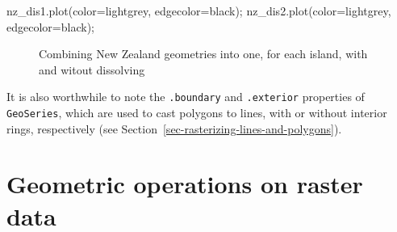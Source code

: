 \documentclass[
  letterpaper,
]{krantz}
\newenvironment{Shaded}{\begin{snugshade}}{\end{snugshade}}
\newcommand{\NormalTok}[1]{\textcolor[rgb]{0.00,0.23,0.31}{#1}}
\newcommand{\OperatorTok}[1]{\textcolor[rgb]{0.37,0.37,0.37}{#1}}
\newcommand{\StringTok}[1]{\textcolor[rgb]{0.13,0.47,0.30}{#1}}
\begin{document}
\begin{Shaded}
\begin{Highlighting}[]
\NormalTok{nz\_dis1.plot(color}\OperatorTok{=}\StringTok{\textquotesingle{}lightgrey\textquotesingle{}}\NormalTok{, edgecolor}\OperatorTok{=}\StringTok{\textquotesingle{}black\textquotesingle{}}\NormalTok{)}\OperatorTok{;}
\NormalTok{nz\_dis2.plot(color}\OperatorTok{=}\StringTok{\textquotesingle{}lightgrey\textquotesingle{}}\NormalTok{, edgecolor}\OperatorTok{=}\StringTok{\textquotesingle{}black\textquotesingle{}}\NormalTok{)}\OperatorTok{;}
\end{Highlighting}
\end{Shaded}

\begin{figure}

\begin{minipage}{0.50\linewidth}



\end{minipage}%
%
\begin{minipage}{0.50\linewidth}



\end{minipage}%

\caption{\label{fig-combine-geoms}Combining New Zealand geometries into
one, for each island, with and witout dissolving}

\end{figure}%

It is also worthwhile to note the \texttt{.boundary} and
\texttt{.exterior} properties of \texttt{GeoSeries}, which are used to
cast polygons to lines, with or without interior rings, respectively
(see Section~\ref{sec-rasterizing-lines-and-polygons}).

\section{Geometric operations on raster data}\label{sec-geo-ras}
\end{document}
